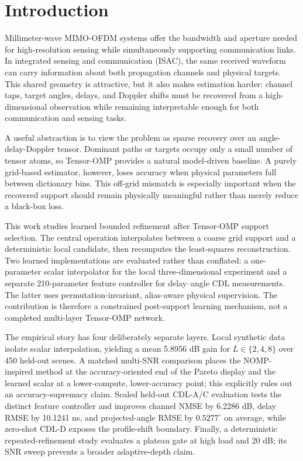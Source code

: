 \section{Introduction}

Millimeter-wave MIMO-OFDM systems offer the bandwidth and aperture needed for high-resolution sensing while simultaneously supporting communication links. In integrated sensing and communication (ISAC), the same received waveform can carry information about both propagation channels and physical targets. This shared geometry is attractive, but it also makes estimation harder: channel taps, target angles, delays, and Doppler shifts must be recovered from a high-dimensional observation while remaining interpretable enough for both communication and sensing tasks.

A useful abstraction is to view the problem as sparse recovery over an angle-delay-Doppler tensor. Dominant paths or targets occupy only a small number of tensor atoms, so Tensor-OMP provides a natural model-driven baseline. A purely grid-based estimator, however, loses accuracy when physical parameters fall between dictionary bins. This off-grid mismatch is especially important when the recovered support should remain physically meaningful rather than merely reduce a black-box loss.

This work studies learned bounded refinement after Tensor-OMP support selection. The central operation interpolates between a coarse grid support and a deterministic local candidate, then recomputes the least-squares reconstruction. Two learned implementations are evaluated rather than conflated: a one-parameter scalar interpolator for the local three-dimensional experiment and a separate 210-parameter feature controller for delay--angle CDL measurements. The latter uses permutation-invariant, alias-aware physical supervision. The contribution is therefore a constrained post-support learning mechanism, not a completed multi-layer Tensor-OMP network.

The empirical story has four deliberately separate layers. Local synthetic data isolate scalar interpolation, yielding a mean 5.8956 dB gain for $L\in\{2,4,8\}$ over 450 held-out scenes. A matched multi-SNR comparison places the NOMP-inspired method at the accuracy-oriented end of the Pareto display and the learned scalar at a lower-compute, lower-accuracy point; this explicitly rules out an accuracy-supremacy claim. Scaled held-out CDL-A/C evaluation tests the distinct feature controller and improves channel NMSE by 6.2286 dB, delay RMSE by 10.1241 ns, and projected-angle RMSE by $0.5277^\circ$ on average, while zero-shot CDL-D exposes the profile-shift boundary. Finally, a deterministic repeated-refinement study evaluates a plateau gate at high load and 20 dB; its SNR sweep prevents a broader adaptive-depth claim.

